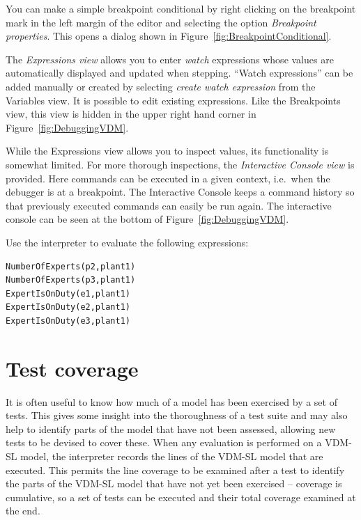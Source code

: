 {You can make a simple breakpoint conditional by right clicking on the
breakpoint mark in the left margin of the editor and selecting the
option \emph{Breakpoint properties}. This opens a dialog shown in
Figure~\ref{fig:BreakpointConditional}.

The \emph{Expressions view} allows you to enter \emph{watch}
expressions whose values are automatically displayed and updated when
stepping. ``Watch expressions'' can be added manually or created by
selecting \emph{create watch expression} from the Variables view. It
is possible to edit existing expressions.  Like the Breakpoints view,
this view is hidden in the upper right hand corner in
Figure~\ref{fig:DebuggingVDM}.

While the Expressions view allows you to inspect values, its
functionality is somewhat limited. For more thorough inspections, the
\emph{Interactive Console view} is provided. Here commands can be
executed in a given context, i.e.\ when the debugger is at a
breakpoint. The Interactive Console keeps a command history so that
previously executed commands can easily be run again. The interactive
console can be seen at the bottom of
Figure~\ref{fig:DebuggingVDM}.

\begin{myexercise}
\label{ex:tool-monitor}Use the interpreter to evaluate the
  following expressions:
\begin{lstlisting}
NumberOfExperts(p2,plant1)
NumberOfExperts(p3,plant1)
ExpertIsOnDuty(e1,plant1)
ExpertIsOnDuty(e2,plant1)
ExpertIsOnDuty(e3,plant1)
\end{lstlisting}
\end{myexercise}


\section{Test coverage}\label{sec:testcov}

It is often useful to know how much of a model has been exercised by a
set of tests. This gives some insight into the thoroughness of a test
suite and may also help to identify parts of the model that have not
been assessed, allowing new tests to be devised to cover these. When
any evaluation is performed on a VDM-SL model, the interpreter records
the lines of the VDM-SL model that are executed. This permits the line
coverage to be examined after a test to identify the parts of the
VDM-SL model that have not yet been exercised -- coverage is
cumulative, so a set of tests can be executed and their total coverage
examined at the end.

}
